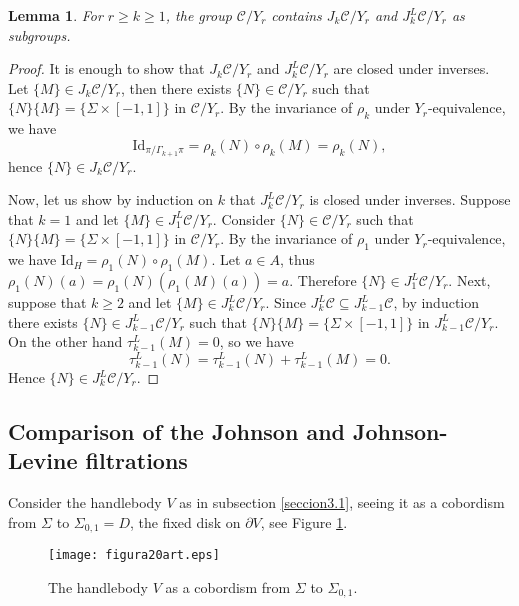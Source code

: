 \documentclass[10pt]{amsart}
\numberwithin{equation}{section}
\numberwithin{equation}{section}
\newtheorem{lemma}[theorem]{Lemma}
\theoremstyle{definition}
\begin{document}
\begin{lemma}For $r\geq k\geq 1$, the group $\mathcal{C}/Y_r$ contains $J_k\mathcal{C}/Y_r$ and $J_k^L\mathcal{C}/Y_r$ as subgroups.
\end{lemma}
\begin{proof}
It is enough  to show that $J_k\mathcal{C}/Y_r$ and $J_k^L\mathcal{C}/Y_r$  are closed under inverses. Let $\{M\}\in J_k\mathcal{C}/Y_r$, then there exists $\{N\}\in \mathcal{C}/Y_r$ such that $\{N\}\{M\}=\{\Sigma\times\left[-1,1\right]\}$ in $\mathcal{C}/Y_r$. By the invariance of $\rho_k$ under $Y_r$-equivalence, we have 
$$\text{Id}_{\pi/\Gamma_{k+1}\pi}=\rho_k(N)\circ\rho_k(M)=\rho_k(N),$$
hence $\{N\}\in J_k\mathcal{C}/Y_r$. 

Now, let us show by induction on $k$ that $J^L_k\mathcal{C}/Y_r$ is closed under inverses. Suppose that $k=1$ and let $\{M\}\in J^L_1\mathcal{C}/Y_r$. Consider $\{N\}\in \mathcal{C}/Y_r$ such that $\{N\}\{M\}=\{\Sigma\times\left[-1,1\right]\}$ in $\mathcal{C}/Y_r$. By the invariance of $\rho_1$ under $Y_r$-equivalence, we have $\text{Id}_{H}=\rho_1(N)\circ\rho_1(M)$. Let $a\in A$, thus $\rho_1(N)(a)=\rho_1(N)(\rho_1(M)(a))=a$. Therefore $\{N\}\in J^L_1\mathcal{C}/Y_r$. Next, suppose that $k\geq 2$ and let $\{M\}\in J^L_k\mathcal{C}/Y_r$. Since $J^L_k\mathcal{C}\subseteq  J^L_{k-1}\mathcal{C}$, by induction there exists  $\{N\}\in J^L_{k-1}\mathcal{C}/Y_r$ such that $\{N\}\{M\}=\{\Sigma\times\left[-1,1\right]\}$ in $J^L_{k-1}\mathcal{C}/Y_r$. On the other hand $\tau^L_{k-1}(M)=0$, so we have
$$\tau^L_{k-1}(N)=\tau^L_{k-1}(N)+\tau^L_{k-1}(M)=0.$$
Hence $\{N\}\in J^L_k\mathcal{C}/Y_r$. 
\end{proof}

  

\subsection{Comparison of  the Johnson and Johnson-Levine filtrations}

Consider the handlebody $V$ as in subsection \ref{seccion3.1}, seeing it as a cobordism from $\Sigma$ to $\Sigma_{0,1}=D$, the fixed disk on $\partial V$,  see Figure \ref{figure4.20}.
\begin{figure}[H] 
										\centering
                        \texttt{[image: figura20art.eps]}
												\caption{The handlebody  $V$ as a cobordism from $\Sigma$ to $\Sigma_{0,1}$.}
												\label{figure4.20}
\end{figure}
\end{document}
